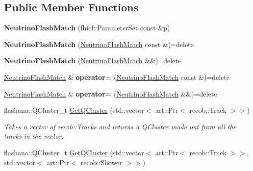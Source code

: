\subsection*{Public Member Functions}
\begin{DoxyCompactItemize}
\item 
\hypertarget{classNeutrinoFlashMatch_a2c3aa4e9461e3f31e9d198ba5d481cd6}{{\bfseries Neutrino\-Flash\-Match} (fhicl\-::\-Parameter\-Set const \&p)}\label{classNeutrinoFlashMatch_a2c3aa4e9461e3f31e9d198ba5d481cd6}

\item 
\hypertarget{classNeutrinoFlashMatch_af69b13e9ca68fff69d3e9d8280d9c436}{{\bfseries Neutrino\-Flash\-Match} (\hyperlink{classNeutrinoFlashMatch}{Neutrino\-Flash\-Match} const \&)=delete}\label{classNeutrinoFlashMatch_af69b13e9ca68fff69d3e9d8280d9c436}

\item 
\hypertarget{classNeutrinoFlashMatch_a5e58dc2e3e587db95317151b1acd6518}{{\bfseries Neutrino\-Flash\-Match} (\hyperlink{classNeutrinoFlashMatch}{Neutrino\-Flash\-Match} \&\&)=delete}\label{classNeutrinoFlashMatch_a5e58dc2e3e587db95317151b1acd6518}

\item 
\hypertarget{classNeutrinoFlashMatch_afd7be5fa45629eca0b992c8d31adc747}{\hyperlink{classNeutrinoFlashMatch}{Neutrino\-Flash\-Match} \& {\bfseries operator=} (\hyperlink{classNeutrinoFlashMatch}{Neutrino\-Flash\-Match} const \&)=delete}\label{classNeutrinoFlashMatch_afd7be5fa45629eca0b992c8d31adc747}

\item 
\hypertarget{classNeutrinoFlashMatch_ac1b32943963d8f7f50339410dbdcfd5c}{\hyperlink{classNeutrinoFlashMatch}{Neutrino\-Flash\-Match} \& {\bfseries operator=} (\hyperlink{classNeutrinoFlashMatch}{Neutrino\-Flash\-Match} \&\&)=delete}\label{classNeutrinoFlashMatch_ac1b32943963d8f7f50339410dbdcfd5c}

\item 
\hypertarget{classNeutrinoFlashMatch_aa511b92472bb70883c5a666293be1da3}{flashana\-::\-Q\-Cluster\-\_\-t \hyperlink{classNeutrinoFlashMatch_aa511b92472bb70883c5a666293be1da3}{Get\-Q\-Cluster} (std\-::vector$<$ art\-::\-Ptr$<$ recob\-::\-Track $>$$>$)}\label{classNeutrinoFlashMatch_aa511b92472bb70883c5a666293be1da3}

\begin{DoxyCompactList}\small\item\em Takes a vector of recob\-::\-Tracks and returns a Q\-Cluster made out from all the tracks in the vector. \end{DoxyCompactList}\item 
\hypertarget{classNeutrinoFlashMatch_a9f4dea53f7e7aa983ec69859bf48a6bd}{flashana\-::\-Q\-Cluster\-\_\-t \hyperlink{classNeutrinoFlashMatch_a9f4dea53f7e7aa983ec69859bf48a6bd}{Get\-Q\-Cluster} (std\-::vector$<$ art\-::\-Ptr$<$ recob\-::\-Track $>$$>$, std\-::vector$<$ art\-::\-Ptr$<$ recob\-::\-Shower $>$$>$)}\label{classNeutrinoFlashMatch_a9f4dea53f7e7aa983ec69859bf48a6bd}


\end{DoxyCompactItemize}
